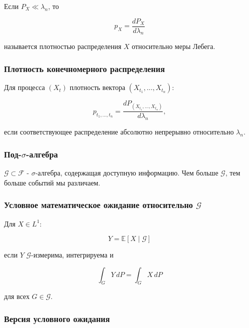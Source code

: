 \documentclass[
  11pt,
  a4paper,
]{article}
\begin{document}
Если \(P_X\ll\lambda_n\), то

\[
p_X=\frac{dP_X}{d\lambda_n}
\]

называется плотностью распределения \(X\) относительно меры Лебега.

\subsubsection{Плотность конечномерного
распределения}\label{ux43fux43bux43eux442ux43dux43eux441ux442ux44c-ux43aux43eux43dux435ux447ux43dux43eux43cux435ux440ux43dux43eux433ux43e-ux440ux430ux441ux43fux440ux435ux434ux435ux43bux435ux43dux438ux44f}

Для процесса \((X_t)\) плотность вектора \((X_{t_1},\ldots,X_{t_n})\):

\[
p_{t_1,\ldots,t_n}
=
\frac{dP_{(X_{t_1},\ldots,X_{t_n})}}{d\lambda_n},
\]

если соответствующее распределение абсолютно непрерывно относительно
\(\lambda_n\).

\subsubsection{\texorpdfstring{Под-\(\sigma\)-алгебра}{Под-\textbackslash sigma-алгебра}}\label{ux43fux43eux434-sigma-ux430ux43bux433ux435ux431ux440ux430}

\(\mathcal G\subset\mathcal F\) - \(\sigma\)-алгебра, содержащая
доступную информацию. Чем больше \(\mathcal G\), тем больше событий мы
различаем.

\subsubsection{\texorpdfstring{Условное математическое ожидание
относительно
\(\mathcal G\)}{Условное математическое ожидание относительно \textbackslash mathcal G}}\label{ux443ux441ux43bux43eux432ux43dux43eux435-ux43cux430ux442ux435ux43cux430ux442ux438ux447ux435ux441ux43aux43eux435-ux43eux436ux438ux434ux430ux43dux438ux435-ux43eux442ux43dux43eux441ux438ux442ux435ux43bux44cux43dux43e-mathcal-g}

Для \(X\in L^1\):

\[
Y=\mathbb E[X\mid\mathcal G]
\]

если \(Y\) \(\mathcal G\)-измерима, интегрируема и

\[
\int_GY\,dP=\int_GX\,dP
\]

для всех \(G\in\mathcal G\).

\subsubsection{Версия условного
ожидания}\label{ux432ux435ux440ux441ux438ux44f-ux443ux441ux43bux43eux432ux43dux43eux433ux43e-ux43eux436ux438ux434ux430ux43dux438ux44f}
\end{document}
